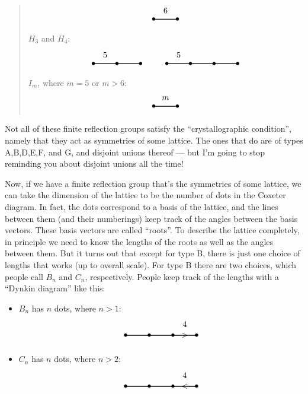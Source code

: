 \documentclass{article}
\def\tightlist{}
\begin{document}
\begin{quote}
\[\begin{tikzpicture}
    \draw[thick] (0,0) node{$\bullet$} to node[label=above:{6}]{} (1,0) node{$\bullet$};
  \end{tikzpicture}
\] \(H_3\) and \(H_4\): \[
  \begin{tikzpicture}
    \draw[thick] (0,0) node{$\bullet$} to node[label=above:{5}]{} (1,0) node{$\bullet$} to (2,0) node{$\bullet$};
  \end{tikzpicture}
  \qquad
  \begin{tikzpicture}
  \draw[thick] (0,0) node{$\bullet$} to node[label=above:{5}]{} (1,0) node{$\bullet$} to (2,0) node{$\bullet$} to (3,0) node {$\bullet$};
\end{tikzpicture}
\] \(I_m\), where \(m = 5\) or \(m > 6\): \[
  \begin{tikzpicture}
    \draw[thick] (0,0) node{$\bullet$} to node[label=above:{$m$}]{} (1,0) node{$\bullet$};
  \end{tikzpicture}
\]
\end{quote}

Not all of these finite reflection groups satisfy the ``crystallographic
condition'', namely that they act as symmetries of some lattice. The
ones that do are of types A,B,D,E,F, and G, and disjoint unions thereof
--- but I'm going to stop reminding you about disjoint unions all the
time!

Now, if we have a finite reflection group that's the symmetries of some
lattice, we can take the dimension of the lattice to be the number of
dots in the Coxeter diagram. In fact, the dots correspond to a basis of
the lattice, and the lines between them (and their numberings) keep
track of the angles between the basis vectors. These basis vectors are
called ``roots''. To describe the lattice completely, in principle we
need to know the lengths of the roots as well as the angles between
them. But it turns out that except for type B, there is just one choice
of lengths that works (up to overall scale). For type B there are two
choices, which people call \(B_n\) and \(C_n\), respectively. People
keep track of the lengths with a ``Dynkin diagram'' like this:

\begin{itemize}
\tightlist
\item
  \(B_n\) has \(n\) dots, where \(n>1\): \[
      \begin{tikzpicture}
        \draw[thick] (0,0) node{$\bullet$} to (1,0) node{$\bullet$} to (2,0) node{$\bullet$} to node[label=above:{4}]{\textgreater} (3,0) node {$\bullet$};
      \end{tikzpicture}
    \]
\item
  \(C_n\) has \(n\) dots, where \(n>2\): \[
      \begin{tikzpicture}
        \draw[thick] (0,0) node{$\bullet$} to (1,0) node{$\bullet$} to (2,0) node{$\bullet$} to node[label=above:{4}]{\textless} (3,0) node {$\bullet$};
      \end{tikzpicture}
    \]
\end{itemize}
\end{document}
